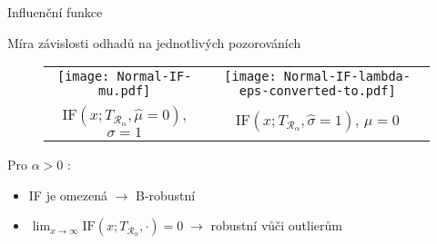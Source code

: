 \documentclass[11pt]{beamer}
\newcommand{\intpa}{\int p_\theta^{1+\alpha}(x) \, \mathrm{d}x }
\newcommand{\fn}{\frac{1}{n} \sum_{i=1}^n p_{\theta}^{\alpha}\left( x_i \right)}
\newcommand{\fln}{\frac{1}{n} \sum_{i=1}^n \ln p_{\theta}\left( x_i \right)}
\newcommand{\amtiT}{\arg \max_{\theta \in \Theta}}
\begin{document}

\begin{frame}{Influenční funkce} %

{\footnotesize Míra závislosti odhadů na jednotlivých pozorováních }
\vspace*{-0.1in}	
\begin{figure}[htb]
\begin{tabular}{cc}
	\texttt{[image: Normal-IF-mu.pdf]}
	&
	\texttt{[image: Normal-IF-lambda-eps-converted-to.pdf]}
	\\
	{\footnotesize $\mathrm{IF}(x;T_{\mathcal{R}_\alpha},\widehat{\mu} = 0) $, $\sigma = 1$}
	&
	{\footnotesize $\mathrm{IF}(x;T_{\mathcal{R}_\alpha},\widehat{\sigma} = 1)$, $\mu = 0$}
	\\
\end{tabular}
\end{figure}
\vspace*{-0.1in}	
{\footnotesize Pro $\alpha> 0$ :}
\begin{itemize}
	\item {\footnotesize IF je omezená $\rightarrow$ B-robustní}
	\item {\footnotesize$\lim_{x\rightarrow \infty} \mathrm{IF}(x;T_{\mathcal{R}_\alpha},\cdot) = 0 \; \rightarrow$ robustní vůči outlierům}
\end{itemize}
\end{frame}
\end{document}
